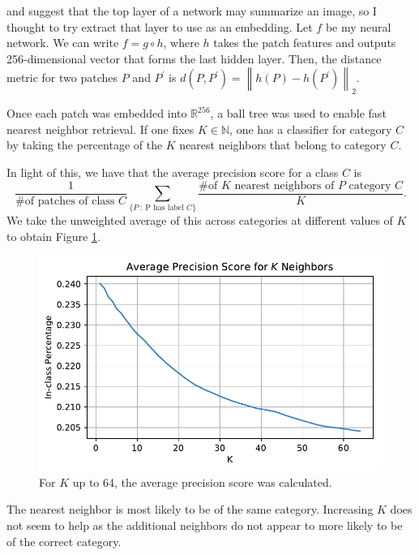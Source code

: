 \documentclass[letterpaper]{article}
\begin{document}
\cite{neural_codes} and \cite{imagenet} suggest that the top layer of a network
may summarize an image, so I thought to try extract that layer to use as an
embedding. Let $f$ be my neural network. We can write $f = g \circ h$, where $h$
takes the patch features and outputs 256-dimensional vector that forms the last
hidden layer. Then, the distance metric for two patches $P$ and $P^\prime$ is
$d\left(P,P^\prime\right) = \left\lVert h\left(P\right) -
  h\left(P^\prime\right)\right\rVert_2$.

Once each patch was embedded into $\mathbb{R}^{256}$, a ball tree was used to
enable fast nearest neighbor retrieval. If one fixes $K \in \mathbb{N}$, one has
a classifier for category $C$ by taking the percentage of the $K$ nearest
neighbors that belong to category $C$.

In light of this, we have that the average precision score for a class $C$ is
\begin{equation}
  \frac{1}{\text{\# of patches of class $C$}}
  \sum_{\{P~:~\text{P has label $C$}\}}\frac{\text{\# of $K$ nearest neighbors of $P$ category $C$}}{K}.
\end{equation}
We take the unweighted average of this across categories at different values of
$K$ to obtain Figure \ref{fig:metric_average_precision_score}.

\begin{figure}[h]
  \centering
  \includegraphics{metric_learning/metric_average_precision_score.pdf}
  \caption{For $K$ up to 64, the average precision score was calculated.}
  \label{fig:metric_average_precision_score}
\end{figure}

The nearest neighbor is most likely to be of the same category. Increasing $K$
does not seem to help as the additional neighbors do not appear to more likely
to be of the correct category.
\end{document}
